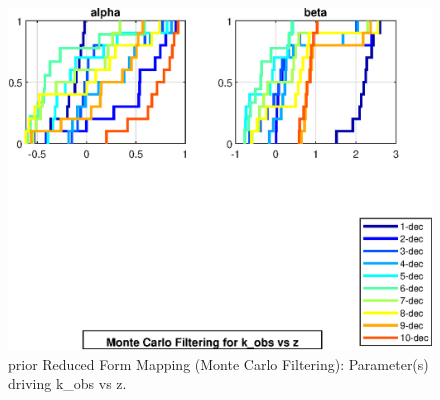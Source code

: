 
\begin{figure}[H]
\centering 
\includegraphics[width=1.00\textwidth]{RBC_kz/gsa/redform_prior/k_obs_vs_z_threshold/RBC_kz_prior_k_obs_vs_z_threshold}
\caption{prior Reduced Form Mapping (Monte Carlo Filtering): Parameter(s) driving k\_obs vs z.}\label{Fig:RBC_kz_prior_k_obs_vs_z_threshold}
\end{figure}

